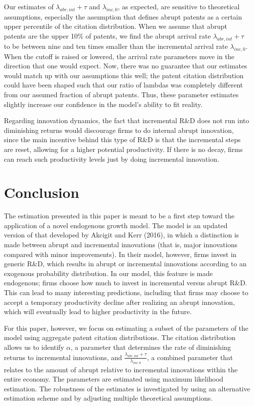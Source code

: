 \documentclass[letterpaper,12pt]{article}
\theoremstyle{definition}
\begin{document}
Our estimates of $\lambda_{abr, int} + \tau$ and $\lambda_{inc,0}$, as expected, are sensitive to theoretical assumptions, especially the assumption that defines abrupt patents as a certain upper percentile of the citation distribution. When we assume that abrupt patents are the upper 10\% of patents, we find the abrupt arrival rate $\lambda_{abr, int} + \tau$ to be between nine and ten times smaller than the incremental arrival rate $\lambda_{inc,0}$. When the cutoff is raised or lowered, the arrival rate parameters move in the direction that one would expect. Now, there was no guarantee that our estimates would match up with our assumptions this well; the patent citation distribution could have been shaped such that our ratio of lambdas was completely different from our assumed fraction of abrupt patents. Thus, these parameter estimates slightly increase our confidence in the model's ability to fit reality.

Regarding innovation dynamics, the fact that incremental R\&D does not run into diminishing returns would discourage firms to do internal abrupt innovation, since the main incentive behind this type of R\&D is that the incremental steps are reset, allowing for a higher potential productivity. If there is no decay, firms can reach such productivity levels just by doing incremental innovation. 

\section{Conclusion}\label{sec:Conclusion}
The estimation presented in this paper is meant to be a first step toward the application of a novel endogenous growth model. The model is an updated version of that developed by Akcigit and Kerr (2016), in which a distinction is made between abrupt and incremental innovations (that is, major innovations compared with minor improvements). In their model, however, firms invest in generic R\&D, which results in abrupt or incremental innovations according to an exogenous probability distribution. In our model, this feature is made endogenous; firms choose how much to invest in incremental versus abrupt R\&D. This can lead to many interesting predictions, including that firms may choose to accept a temporary productivity decline after realizing an abrupt innovation, which will eventually lead to higher productivity in the future.

For this paper, however, we focus on estimating a subset of the parameters of the model using aggregate patent citation distributions. The citation distribution allows us to identify $\alpha$, a parameter that determines the rate of diminishing returns to incremental innovations, and $\frac{\lambda_{abr, int} + \tau}{\lambda_{inc,0}}$, a combined parameter that relates to the amount of abrupt relative to incremental innovations within the entire economy. The parameters are estimated using maximum likelihood estimation. The robustness of the estimates is investigated by using an alternative estimation scheme and by adjusting multiple theoretical assumptions.
\end{document}
